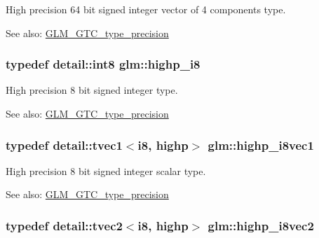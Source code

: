 High precision 64 bit signed integer vector of 4 components type. \begin{Desc}
\item[See also:]\hyperlink{group__gtc__type__precision}{GLM\_\-GTC\_\-type\_\-precision} \end{Desc}
\hypertarget{group__gtc__type__precision_g8b9eb0b24cce7f14478bfcacb53ce839}{
\subsubsection[highp\_\-i8]{\setlength{\rightskip}{0pt plus 5cm}typedef detail::int8 {\bf glm::highp\_\-i8}}}
\label{group__gtc__type__precision_g8b9eb0b24cce7f14478bfcacb53ce839}


High precision 8 bit signed integer type. \begin{Desc}
\item[See also:]\hyperlink{group__gtc__type__precision}{GLM\_\-GTC\_\-type\_\-precision} \end{Desc}
\hypertarget{group__gtc__type__precision_g0334353753f93388bcc89f91c9aff476}{
\subsubsection[highp\_\-i8vec1]{\setlength{\rightskip}{0pt plus 5cm}typedef detail::tvec1$<$i8, highp$>$ {\bf glm::highp\_\-i8vec1}}}
\label{group__gtc__type__precision_g0334353753f93388bcc89f91c9aff476}


High precision 8 bit signed integer scalar type. \begin{Desc}
\item[See also:]\hyperlink{group__gtc__type__precision}{GLM\_\-GTC\_\-type\_\-precision} \end{Desc}
\hypertarget{group__gtc__type__precision_g2224945795a870e41d951f0847d54f02}{
\subsubsection[highp\_\-i8vec2]{\setlength{\rightskip}{0pt plus 5cm}typedef detail::tvec2$<$i8, highp$>$ {\bf glm::highp\_\-i8vec2}}}
\label{group__gtc__type__precision_g2224945795a870e41d951f0847d54f02}


